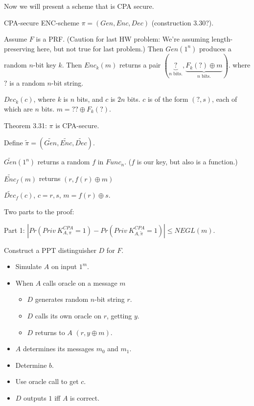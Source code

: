 \documentclass[11pt]{article}
\newcommand{\xor}{\oplus}
\begin{document}
Now we will present a scheme that is CPA secure.

CPA-secure ENC-scheme $\pi=(Gen, Enc, Dec)$ (construction 3.30?).

Assume $F$ is a PRF. (Caution for last HW problem: We're assuming length-preserving here, but not true for last problem.) Then $Gen(1^n)$ produces a random $n$-bit key $k$. Then $Enc_k(m)$ returns a pair $(\underbrace{?}_{\text{$n$ bits.}},\underbrace{F_k(?)\xor m}_{\text{$n$ bits.}})$. where $?$ is a random $n$-bit string.

$Dec_k(c)$, where $k$ is $n$ bits, and $c$ is $2n$ bits. $c$ is of the form $(?, s)$, each of which are $n$ bits. $m=??\xor F_k(?)$.

Theorem 3.31: $\pi$ is CPA-secure. 

Define $\widetilde{\pi}=(\widetilde{Gen},\widetilde{Enc},\widetilde{Dec})$.

$\widetilde{Gen}(1^n)$ returns a random $f$ in $Func_n$. ($f$ is our key, but also is a function.)

$\widetilde{Enc}_f(m)$ returns $(r, f(r)\xor m)$

$\widetilde{Dec}_f(c)$, $c=r, s$, $m=f(r)\xor s$.

Two parts to the proof:

Part 1: $|Pr(Priv\ K_{A,\pi}^{CPA}=1)-Pr(Priv\ K_{A,\widetilde{\pi}}^{CPA}=1)|\leq NEGL(m)$.

Construct a PPT distinguisher $D$ for $F$.\begin{itemize}

\item Simulate $A$ on input $1^m$.

\item When $A$ calls oracle on a message $m$\begin{itemize}

\item $D$ generates random $n$-bit string $r$.

\item $D$ calls its own oracle on $r$, getting $y$.

\item $D$ returns to $A$ $(r, y\xor m)$.

\end{itemize}

\item $A$ determines its messages $m_0$ and $m_1$.

\item Determine $b$.

\item Use oracle call to get $c$.

\item $D$ outputs $1$ iff $A$ is correct.

\end{itemize}
\end{document}
